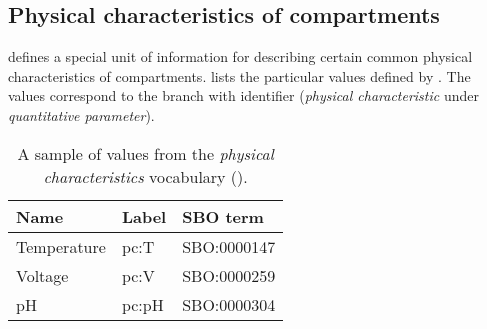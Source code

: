 \subsection{Physical characteristics of compartments}
\label{sec:af:physical-characteristics-cv}

\SBGNAFLone defines a special unit of information for describing certain common physical characteristics of compartments.   lists the particular values defined by \SBGNAFLone.  The values correspond to the \sbo branch with identifier  (\emph{physical characteristic} under \emph{quantitative parameter}).

\begin{table}[h]
  \centering
  \begin{tabular}{l>{\ttfamily}l>{\ttfamily}l}
    \toprule
    \textbf{Name}   & \textbf{\rmfamily Label} & \textbf{\rmfamily SBO term} \\
    \midrule
    Temperature   & pc:T  & SBO:0000147\\
    Voltage       & pc:V  & SBO:0000259\\
    pH            & pc:pH & SBO:0000304\\
    \bottomrule
  \end{tabular}
  \caption{A sample of values from the \emph{physical
      characteristics} vocabulary ().}
  \label{tab:af:physical-characteristics-cv}
\end{table}

%
%
